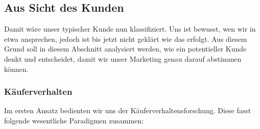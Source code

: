 \subsection{Aus Sicht des Kunden}
Damit wäre unser typischer Kunde nun klassifiziert. Uns ist bewusst, wen wir in etwa ansprechen, jedoch ist bis jetzt nicht geklärt wie das erfolgt. Aus diesem Grund soll in diesem Abschnitt analysiert werden, wie ein potentieller Kunde denkt und entscheidet, damit wir unser Marketing genau darauf abstimmen können.

\subsubsection{Käuferverhalten}
Im ersten Ansatz bedienten wir uns der Käuferverhaltensforschung. Diese fasst folgende wesentliche Paradigmen zusammen:\\

